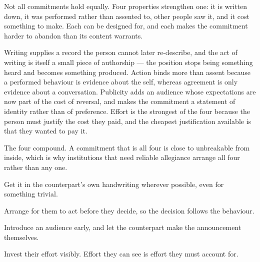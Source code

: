 


\begin{core}
Not all commitments hold equally. Four properties strengthen one: it is written down, it was performed rather than assented to, other people saw it, and it cost something to make. Each can be designed for, and each makes the commitment harder to abandon than its content warrants.
\end{core}

\begin{mechanism}
Writing supplies a record the person cannot later re-describe, and the act of writing is itself a small piece of authorship --- the position stops being something heard and becomes something produced. Action binds more than assent because a performed behaviour is evidence about the self, whereas agreement is only evidence about a conversation. Publicity adds an audience whose expectations are now part of the cost of reversal, and makes the commitment a statement of identity rather than of preference. Effort is the strongest of the four because the person must justify the cost they paid, and the cheapest justification available is that they wanted to pay it.

The four compound. A commitment that is all four is close to unbreakable from inside, which is why institutions that need reliable allegiance arrange all four rather than any one.
\end{mechanism}

\begin{application}
  \item Get it in the counterpart's own handwriting wherever possible, even for something trivial.
  \item Arrange for them to act before they decide, so the decision follows the behaviour.
  \item Introduce an audience early, and let the counterpart make the announcement themselves.
  \item Invest their effort visibly. Effort they can see is effort they must account for.
\end{application}

